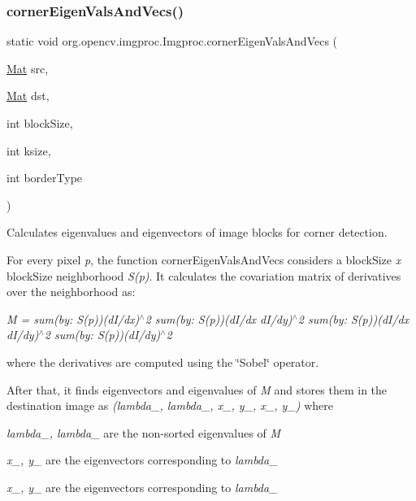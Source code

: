 \subsubsection{\texorpdfstring{corner\+Eigen\+Vals\+And\+Vecs()}{cornerEigenValsAndVecs()}\hspace{0.1cm}{\footnotesize\ttfamily [1/2]}}
{\footnotesize\ttfamily static void org.\+opencv.\+imgproc.\+Imgproc.\+corner\+Eigen\+Vals\+And\+Vecs (\begin{DoxyParamCaption}\item[{\mbox{\hyperlink{classorg_1_1opencv_1_1core_1_1_mat}{Mat}}}]{src,  }\item[{\mbox{\hyperlink{classorg_1_1opencv_1_1core_1_1_mat}{Mat}}}]{dst,  }\item[{int}]{block\+Size,  }\item[{int}]{ksize,  }\item[{int}]{border\+Type }\end{DoxyParamCaption})\hspace{0.3cm}{\ttfamily [static]}}

Calculates eigenvalues and eigenvectors of image blocks for corner detection.

For every pixel {\itshape p}, the function {\ttfamily corner\+Eigen\+Vals\+And\+Vecs} considers a {\ttfamily block\+Size} {\itshape x} {\ttfamily block\+Size} neighborhood {\itshape S(p)}. It calculates the covariation matrix of derivatives over the neighborhood as\+:

{\itshape M = sum(by\+: S(p))(d\+I/dx)$^\wedge$2 sum(by\+: S(p))(d\+I/dx d\+I/dy)$^\wedge$2 sum(by\+: S(p))(d\+I/dx d\+I/dy)$^\wedge$2 sum(by\+: S(p))(d\+I/dy)$^\wedge$2 }

where the derivatives are computed using the \char`\"{}\+Sobel\char`\"{} operator.

After that, it finds eigenvectors and eigenvalues of {\itshape M} and stores them in the destination image as {\itshape (lambda\+\_, lambda\+\_, x\+\_, y\+\_, x\+\_, y\+\_)} where


\begin{DoxyItemize}
\item {\itshape lambda\+\_, lambda\+\_} are the non-\/sorted eigenvalues of {\itshape M} 
\item {\itshape x\+\_, y\+\_} are the eigenvectors corresponding to {\itshape lambda\+\_} 
\item {\itshape x\+\_, y\+\_} are the eigenvectors corresponding to {\itshape lambda\+\_} 
\end{DoxyItemize}

